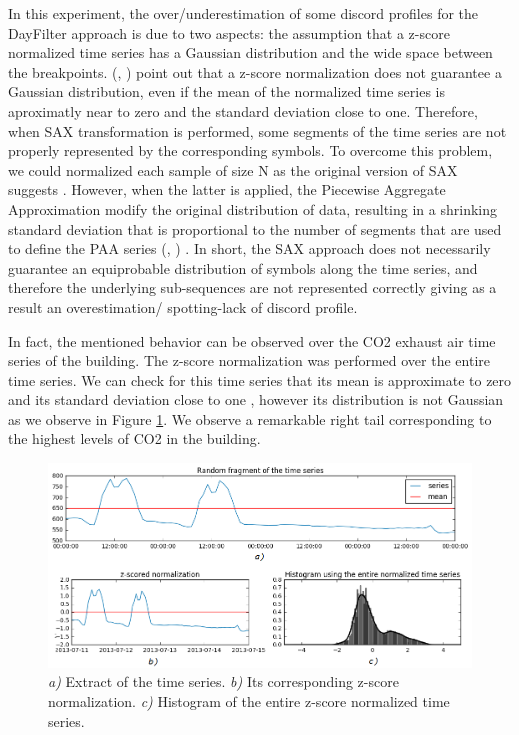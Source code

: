 In this experiment, the over/underestimation of some discord profiles for the DayFilter approach is due to two aspects: the assumption that a z-score normalized time series has a Gaussian distribution  \cite{lin2003symbolic, keogh2005hot, lin2007experiencing, miller2015automated} and the wide space between the breakpoints. (\citeauthor{li2015encyclopedia}, \citeyear{li2015encyclopedia}) \cite{li2015encyclopedia} point out that a z-score normalization does not guarantee a Gaussian distribution, even if the mean of the normalized time series is aproximatly near to zero and the standard deviation close to one. Therefore, when SAX transformation is performed, some segments of the time series are not properly represented by the corresponding symbols. To overcome this problem, we could normalized each sample of size N as the original version of SAX suggests \cite{keogh2005hot}. However, when the latter is applied, the Piecewise Aggregate Approximation modify the original distribution of data, resulting in a shrinking standard deviation that is proportional to the number of segments that are used to define the PAA series (\citeauthor{butler2015sax}, \citeyear{butler2015sax}) \cite{butler2015sax}. In short, the SAX approach does not necessarily guarantee an equiprobable distribution of symbols along the time series, and therefore the underlying sub-sequences are not represented correctly giving as a result an overestimation/ spotting-lack of discord profile.  

In fact, the mentioned behavior can be observed over the CO2 exhaust air time series of the building. The z-score normalization was performed over the entire time series. We can check for this time series that its mean is approximate to zero and its standard deviation close to one \cite{miller2015automated, lin2007experiencing}, however its distribution is not Gaussian as we observe in Figure \ref{fig:histogram}. We observe a remarkable right tail corresponding to the highest levels of CO2 in the building.    

\begin{figure}[h!]
  \vspace{0.5em} %
  \includegraphics[scale=0.55]{Figures/histogram.jpg}
  \caption{ \textit{a)} Extract of the time series. \textit{ b)} Its corresponding z-score normalization. \textit{c)} Histogram of the entire z-score normalized time series. }
  \label{fig:histogram}
\end{figure}     

